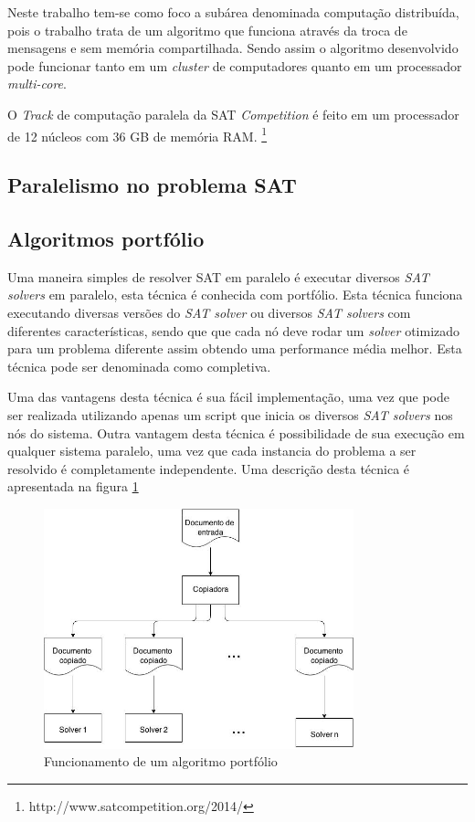 \documentclass{ufsc-thesis}
\begin{document}
Neste trabalho tem-se como foco a subárea denominada computação distribuída, pois 
o trabalho trata de um algoritmo que funciona através da troca de mensagens e sem memória 
compartilhada\cite{Coulouris2011}. Sendo assim o algoritmo desenvolvido pode 
funcionar tanto em um \textit{cluster} de computadores quanto em um processador \textit{multi-core}.

O \textit{Track} de computação paralela da SAT \textit{Competition} é 
feito em um processador de 12 núcleos com 36 GB de memória RAM.
\footnote{http://www.satcompetition.org/2014/}

\subsection{Paralelismo no problema SAT}

\subsection{Algoritmos portfólio}

Uma maneira simples de resolver SAT em paralelo é executar diversos \textit{SAT solvers} 
em paralelo, esta técnica é conhecida com portfólio. Esta técnica funciona executando 
diversas versões do \textit{SAT solver} ou diversos \textit{SAT solvers} com diferentes 
características, sendo que que cada nó deve rodar um \textit{solver} otimizado para um 
problema diferente assim obtendo uma performance média melhor. Esta técnica pode ser 
denominada como completiva.

Uma das vantagens desta técnica é sua fácil implementação, uma vez que pode ser realizada 
utilizando apenas um script que inicia os diversos \textit{SAT solvers} nos nós do sistema. 
Outra vantagem desta técnica é possibilidade de sua execução em qualquer sistema paralelo, uma 
vez que cada instancia do problema a ser resolvido é completamente independente. Uma descrição 
desta técnica é apresentada na figura \ref{fig:port}

\begin{figure}[H]
    \centering
    \includegraphics[width=0.8\textwidth]{figuras/portfolio.jpg}
    \caption{Funcionamento de um algoritmo portfólio\cite{nelson2013new}}
    \label{fig:port}
\end{figure}
\end{document}
